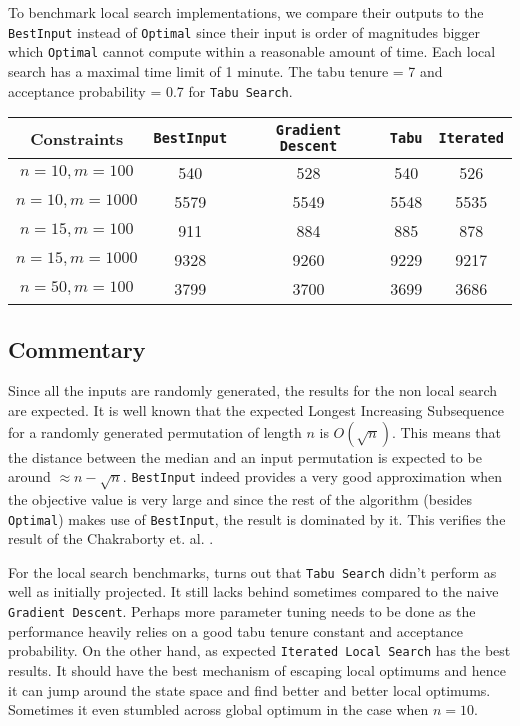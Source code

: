 To benchmark local search implementations, we compare their outputs to the \texttt{BestInput} instead of \texttt{Optimal} since their input is order of magnitudes bigger which \texttt{Optimal} cannot compute within a reasonable amount of time. Each local search has a maximal time limit of 1 minute. The tabu tenure = 7 and acceptance probability = 0.7 for \texttt{Tabu Search}.

\begin{center}
\begin{tabular}{||c | c | c | c | c||} 
 \hline
 Constraints & \texttt{BestInput} & \texttt{Gradient Descent} & \texttt{Tabu} & \texttt{Iterated} \\ [0.5ex]

 \hline\hline
 $n = 10, m = 100$ & 540 & 528 & 540 & 526 \\ 
 \hline
 $n = 10, m = 1000$ & 5579 & 5549 & 5548 & 5535 \\
 \hline
 $n = 15, m = 100$ & 911 & 884 & 885 & 878 \\
 \hline
 $n = 15, m = 1000$ & 9328 & 9260 & 9229 & 9217 \\
 \hline
 $n = 50, m = 100$ & 3799 & 3700 & 3699 & 3686 \\ [1ex] 
 \hline
\end{tabular}
\end{center}

\subsection{Commentary}

Since all the inputs are randomly generated, the results for the non local search are expected. It is well known that the expected Longest Increasing Subsequence for a randomly generated permutation of length $n$ is $O(\sqrt{n})$. This means that the distance between the median and an input permutation is expected to be around $\approx n - \sqrt{n}$. \texttt{BestInput} indeed provides a very good approximation when the objective value is very large and since the rest of the algorithm (besides \texttt{Optimal}) makes use of \texttt{BestInput}, the result is dominated by it. This verifies the result of the Chakraborty et. al. \cite{MainPaper}.

For the local search benchmarks, turns out that \texttt{Tabu Search} didn't perform as well as initially projected. It still lacks behind sometimes compared to the naive \texttt{Gradient Descent}. Perhaps more parameter tuning needs to be done as the performance heavily relies on a good tabu tenure constant and acceptance probability. On the other hand, as expected \texttt{Iterated Local Search} has the best results. It should have the best mechanism of escaping local optimums and hence it can jump around the state space and find better and better local optimums. Sometimes it even stumbled across global optimum in the case when $n = 10$.
